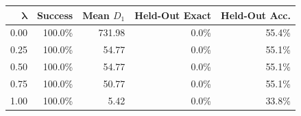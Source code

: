 \begin{tabular}{rrrrr}
\toprule
$\boldsymbol{\lambda}$ & \textbf{Success} & \textbf{Mean $D_1$} & \textbf{Held-Out Exact} & \textbf{Held-Out Acc.} \\
\midrule
0.00 & 100.0\% & 731.98 & 0.0\% & 55.4\% \\
0.25 & 100.0\% & 54.77 & 0.0\% & 55.1\% \\
0.50 & 100.0\% & 54.77 & 0.0\% & 55.1\% \\
0.75 & 100.0\% & 50.77 & 0.0\% & 55.1\% \\
1.00 & 100.0\% & 5.42 & 0.0\% & 33.8\% \\
\bottomrule
\end{tabular}
